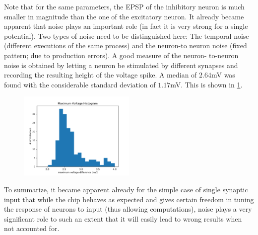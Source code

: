 \documentclass[a4paper,twocolumn]{article}
\begin{document}
Note that for the same parameters,  the EPSP of the inhibitory neuron is much
smaller in magnitude than the one of the excitatory neuron.
It already became apparent that noise plays an important role (in fact it is very
strong for a single potential).  Two types of noise need to be distinguished here:
The temporal noise (different executions of the same process) and the neuron-to
neuron noise (fixed pattern; due to production errors).  A good measure of the neuron-
to-neuron noise is obtained by letting a neuron be stimulated by different synapses 
and recording the resulting height of the voltage spike.  A median of $2.64$mV was
found with the considerable standard deviation of $1.17$mV.  This is shown in 
\ref{MaxVoltHisto}.
\begin{figure}
		\includegraphics[width=0.5\textwidth]{figures/histo_maxVolt.pdf}
		\label{MaxVoltHisto}
\end{figure}		
To summarize,  it became apparent already for the simple case of single synaptic 
input that while the chip behaves as expected and gives certain freedom in tuning 
the response of neurons to input (thus allowing computations),  noise plays a very 
significant role to such an extent that it will easily lead to wrong results when not 
accounted for.  
\end{document}
